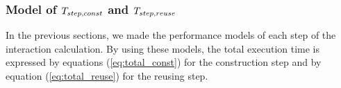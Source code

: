 \documentclass[dvipdfmx]{pasj01}
\begin{document}

\subsubsection{Model of $T_{\rm step, const}$ and $T_{\rm step, reuse}$}

In the previous sections, we made the performance models of each step
of the interaction calculation. By using these models, the total
execution time is expressed by equations (\ref{eq:total_const}) for
the construction step and by equation (\ref{eq:total_reuse}) for the
reusing step.
\end{document}
